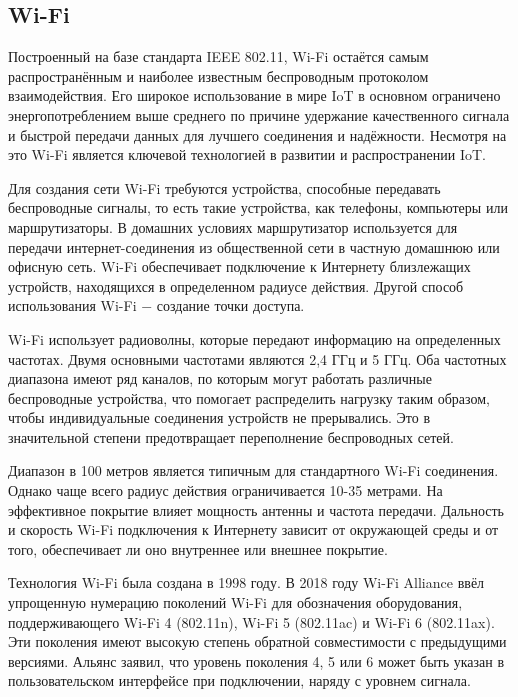 	
	\subsection{Wi-Fi}
	Построенный на базе стандарта IEEE 802.11, Wi-Fi остаётся самым распространённым и наиболее
	известным беспроводным протоколом взаимодействия. Его широкое использование в мире IoT в
	основном ограничено энергопотреблением выше среднего по причине удержание качественного сигнала
	и быстрой передачи данных для лучшего соединения и надёжности. Несмотря на это Wi-Fi является
	ключевой технологией в развитии и распространении IoT.
	
	Для создания сети Wi-Fi требуются устройства, способные передавать беспроводные сигналы, то есть 
	такие устройства, как телефоны, компьютеры или маршрутизаторы. В домашних условиях маршрутизатор 
	используется для передачи интернет-соединения из общественной сети в частную домашнюю или офисную 
	сеть. Wi-Fi обеспечивает подключение к Интернету близлежащих устройств, находящихся в определенном 
	радиусе действия. Другой способ использования Wi-Fi $-$ создание точки доступа.
	
	Wi-Fi использует радиоволны, которые передают информацию на определенных частотах. Двумя основными
	частотами являются 2,4 ГГц и 5 ГГц. Оба частотных диапазона имеют ряд каналов, по которым могут 
	работать различные беспроводные устройства, что помогает распределить нагрузку таким образом, 
	чтобы индивидуальные соединения устройств не прерывались. Это в значительной степени предотвращает 
	переполнение беспроводных сетей.
	
	Диапазон в 100 метров является типичным для стандартного Wi-Fi соединения. Однако чаще всего радиус 
	действия ограничивается 10-35 метрами. На эффективное покрытие влияет мощность антенны 
	и частота передачи. Дальность и скорость Wi-Fi подключения к Интернету зависит от окружающей среды 
	и от того, обеспечивает ли оно внутреннее или внешнее покрытие.
	
	Технология Wi-Fi была создана в 1998 году. В 2018 году Wi-Fi Alliance \cite{wi-fi-alliance} ввёл упрощенную 
	нумерацию поколений Wi-Fi для обозначения оборудования, поддерживающего Wi-Fi 4 (802.11n), 
	Wi-Fi 5 (802.11ac) и Wi-Fi 6 (802.11ax). Эти поколения имеют высокую степень обратной совместимости 
	с предыдущими версиями. Альянс заявил, что уровень поколения 4, 5 или 6 может быть указан в 
	пользовательском интерфейсе при подключении, наряду с уровнем сигнала.
	

